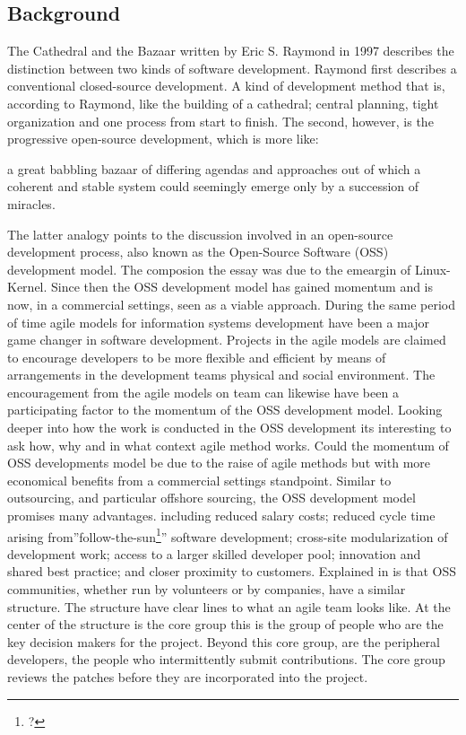 \documentclass[a4paper,11pt]{article}
\begin{document}
{\subsection{Background}
The Cathedral and the Bazaar written by  Eric S. Raymond in 1997 describes the distinction between two kinds of software development. Raymond first describes a conventional closed-source development. A kind of development method that is, according to Raymond, like the building of a cathedral; central planning, tight organization and one process from start to finish. The second, however, is the progressive open-source development, which is more like:
\begin{displayquote}
a great babbling bazaar of differing agendas and approaches out of which a coherent and stable system could seemingly emerge only by a succession of miracles.
\end{displayquote}
The latter analogy points to the discussion involved in an open-source development process, also known as the Open-Source Software (OSS) development model. The composion the essay was due to the emeargin of Linux-Kernel. Since then
the OSS development model has gained momentum and is now, in a commercial settings, seen as a viable approach\cite{Author2008}. During the same period of time agile models for information systems development have been a major game changer in software development. Projects in the agile models are claimed to encourage developers to be more flexible and efficient by means of arrangements in the development teams physical and social environment\cite{Jansson2015}. The encouragement from the agile models on team can likewise have been a participating factor to the momentum of the OSS development model. Looking  deeper into how the work is conducted in the OSS development its interesting to ask how, why and in what context agile method works. Could the momentum of OSS developments model be due to the raise of agile methods but with more economical benefits from a commercial settings standpoint. Similar to outsourcing, and particular offshore sourcing, the OSS development model promises many advantages. including reduced salary costs; reduced cycle time arising from''follow-the-sun\footnote{?}'' software development; cross-site modularization of development work; access to a larger skilled developer pool; innovation and shared best practice; and closer proximity to customers\cite{Author2008}. Explained in \cite{Crowston2006} is that OSS communities, whether run by volunteers or by companies, have a similar structure. The structure have clear lines to what an agile team looks like. At the center of the structure is the core group this is the group of people who are the key decision makers for the project. Beyond this core group, are the peripheral developers, the people who intermittently submit contributions. The core group reviews the patches before they are incorporated into the project. \cite{Crowston2006}

}
\end{document}
